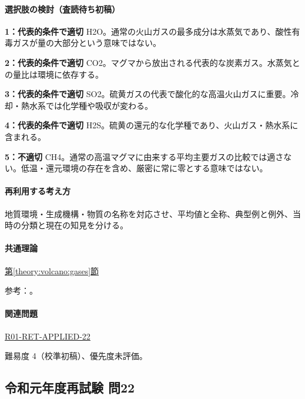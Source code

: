 \paragraph{選択肢の検討（査読待ち初稿）}\mbox{}\par

\noindent\textbf{1：代表的条件で適切} H2O。通常の火山ガスの最多成分は水蒸気であり、酸性有毒ガスが量の大部分という意味ではない。\par

\noindent\textbf{2：代表的条件で適切} CO2。マグマから放出される代表的な炭素ガス。水蒸気との量比は環境に依存する。\par

\noindent\textbf{3：代表的条件で適切} SO2。硫黄ガスの代表で酸化的な高温火山ガスに重要。冷却・熱水系では化学種や吸収が変わる。\par

\noindent\textbf{4：代表的条件で適切} H2S。硫黄の還元的な化学種であり、火山ガス・熱水系に含まれる。\par

\noindent\textbf{5：不適切} CH4。通常の高温マグマに由来する平均主要ガスの比較では適さない。低温・還元環境の存在を含め、厳密に常に零とする意味ではない。\par

\paragraph{再利用する考え方} 地質環境・生成機構・物質の名称を対応させ、平均値と全称、典型例と例外、当時の分類と現在の知見を分ける。

\paragraph{共通理論} \hyperref[theory:volcano:gases]{第\ref*{theory:volcano:gases}節}

\par 参考：\cite{vol50_gas_ref}。

\paragraph{関連問題} \hyperref[q:r01-ret-applied-22]{R01-RET-APPLIED-22}

\par 難易度 4（校準初稿）、優先度未評価。

\subsection{令和元年度再試験 問22}
\label{q:r01-ret-applied-22}

